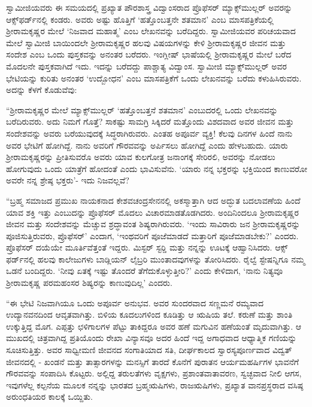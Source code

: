  ಸ್ವಾಮೀಜಿಯವರು ಈ ಸಮಯದಲ್ಲಿ ಪ್ರಖ್ಯಾತ ಪೌರಶಾಸ್ತ್ರ ವಿದ್ವಾಂಸರಾದ ಪ್ರೊಫೆಸರ್ ಮ್ಯಾಕ್ಸ್‌ಮುಲ್ಲರ್ ಅವರನ್ನು ಆಕ್ಸ್​‍ಫರ್ಡ್‍ನಲ್ಲಿ ಕಂಡರು. ಅವರು ಅಷ್ಟು ಹೊತ್ತಿಗೆ ‘ಹತ್ತೊಂಬತ್ತನೇ ಶತಮಾನ’ ಎಂಬ ಮಾಸಪತ್ರಿಕೆಯಲ್ಲಿ ಶ‍್ರೀರಾಮಕೃಷ್ಣರ ಮೇಲೆ ‘ನಿಜವಾದ ಮಹಾತ್ಮ’ ಎಂಬ ಲೇಖನವನ್ನು ಬರೆದಿದ್ದರು. ಸ್ವಾಮೀಜಿಯವರ ಪರಿಚಯವಾದ ಮೇಲೆ ಸ್ವಾಮೀಜಿ ಬಾಯಿಂದಲೇ ಶ‍್ರೀರಾಮಕೃಷ್ಣರ ಹಲವು ವಿಷಯಗಳನ್ನು ಕೇಳಿ ಶ‍್ರೀರಾಮಕೃಷ್ಣರ ಜೀವನ ಮತ್ತು ಸಂದೇಶ ಎಂಬ ಒಂದು ಪುಸ್ತಕವನ್ನು ಅನಂತರ ಬರೆದರು. ಇಂಗ್ಲೀಷ್ ಭಾಷೆಯಲ್ಲಿ ಶ‍್ರೀರಾಮಕೃಷ್ಣರ ಮೇಲೆ ಬರೆದ ಮೊದಲನೇ ಪುಸ್ತಕವಾಗಿದೆ ಇದು. ಇದನ್ನು ಬರೆದದ್ದು ಪಾಶ್ಚಾತ್ಯ ವಿದ್ವಾಂಸ. ಸ್ವಾಮೀಜಿ ಮ್ಯಾಕ್ಸ್‌ಮುಲ್ಲರ್ ಅವರ ಭೇಟಿಯನ್ನು ಕುರಿತು ಅನಂತರ ‘ಉದ್ಬೋಧನ’ ಎಂಬ ಮಾಸಪತ್ರಿಕೆಗೆ ಒಂದು ಲೇಖನವನ್ನು ಬರೆದು ಕಳುಹಿಸಿರುವರು. ಅದನ್ನು ಕೆಳಗೆ ಕೊಡುವೆವು: 

 “ಶ‍್ರೀರಾಮಕೃಷ್ಣರ ಮೇಲೆ ಮ್ಯಾಕ್ಸ್‌ಮುಲ್ಲರ್ ‘ಹತ್ತೊಂಬತ್ತನೆ ಶತಮಾನ’ ಎಂಬುದರಲ್ಲಿ ಒಂದು ಲೇಖನವನ್ನು ಬರೆದಿರುವರು. ಅದು ನಿಮಗೆ ಗೊತ್ತೆ? ಸಾಕಷ್ಟು ಸಾಮಗ್ರಿ ಸಿಕ್ಕಿದರೆ ಮತ್ತೊಂದು ವಿಶದವಾದ ಅವರ ಜೀವನ ಮತ್ತು ಸಂದೇಶವನ್ನು ಅವರು ಬರೆಯುವುದಕ್ಕೆ ಸಿದ್ಧರಾಗಿರುವರು. ಎಂತಹ ಅಪೂರ್ವ ವ್ಯಕ್ತಿ! ಕೆಲವು ದಿನಗಳ ಹಿಂದೆ ನಾನು ಅವರ ಭೇಟಿಗೆ ಹೋಗಿದ್ದೆ. ನಾನು ಅವರಿಗೆ ಗೌರವವನ್ನು ಅರ್ಪಿಸಲು ಹೋಗಿದ್ದೆ ಎಂದು ಹೇಳಬಹುದು. ಯಾರು ಶ‍್ರೀರಾಮಕೃಷ್ಣರನ್ನು ಪ್ರೀತಿಸುವರೊ ಅವರು ಯಾವ ಕುಲಗೋತ್ರ ಜನಾಂಗಕ್ಕೆ ಸೇರಿರಲಿ, ಅವರನ್ನು ನೋಡಲು ಹೋಗುವುದು ಒಂದು ಯಾತ್ರೆಗೆ ಹೋದಂತೆ ಎಂದು ಭಾವಿಸುವೆನು. ‘ಯಾರು ನನ್ನ ಭಕ್ತರನ್ನು ಭಕ್ತಿಯಿಂದ ಕಾಣುವರೋ ಅವರೇ ನನ್ನ ಶ್ರೇಷ್ಠ ಭಕ್ತರು’- ಇದು ನಿಜವಲ್ಲವೆ? 

 “ಬ್ರಹ್ಮ ಸಮಾಜದ ಪ್ರಮುಖ ನಾಯಕನಾದ ಕೇಶವಚಂದ್ರಸೇನನಲ್ಲಿ ಅಕಸ್ಮಾತ್ತಾಗಿ ಆದ ಅದ್ಭುತ ಬದಲಾವಣೆಯ ಹಿಂದೆ ಯಾವ ಶಕ್ತಿ ಇತ್ತು ಎಂಬುದನ್ನು ಪ್ರೊಫೆಸರ್ ಮೊದಲು ವಿಚಾರಮಾಡತೊಡಗಿದರು. ಅಂದಿನಿಂದಲೂ ಶ‍್ರೀರಾಮಕೃಷ್ಣರ ಜೀವನ ಮತ್ತು ಸಂದೇಶವನ್ನು ಮೆಚ್ಚುವ ಶ್ರದ್ಧಾವಂತ ಶಿಷ್ಯರಾಗಿರುವರು. ‘ಇಂದು ಸಾವಿರಾರು ಜನ ಶ‍್ರೀರಾಮಕೃಷ್ಣರನ್ನು ಪೂಜಿಸುತ್ತಿರುವರು, ಪ್ರೊಫೆಸರ್’ ಎಂದಾಗ, ‘ಇಂಥವರಿಗೆ ಪೂಜೆಮಾಡದೆ ಮತ್ತಾರಿಗೆ ಪೂಜೆಮಾಡಬೇಕು?’ ಎಂದರು. ಪ್ರೊಫೆಸರ್ ದಯೆಯೇ ಮೂರ್ತಿವೆತ್ತಂತೆ ಇದ್ದರು. ಮಿಸ್ಟರ್ ಸ್ಟರ‍್ಡಿ ಮತ್ತು ನನ್ನನ್ನು ಊಟಕ್ಕೆ ಆಹ್ವಾನಿಸಿದರು. ಆಕ್ಸ್​‍ಫರ್ಡ್‍ನಲ್ಲಿ ಹಲವು ಕಾಲೇಜುಗಳು ಬಾಡ್ಲಿಯನ್ ಲೈಬ್ರರಿ ಮುಂತಾದವುಗಳನ್ನು ತೋರಿಸಿದರು. ರೈಲ್ವೆ ಸ್ಟೇಷನ್ನಿಗೂ ನಮ್ಮ ಒಡನೆ ಬಂದಿದ್ದರು. ‘ನೀವು ಏತಕ್ಕೆ ಇಷ್ಟು ತೊಂದರೆ ತೆಗೆದುಕೊಳ್ಳುತ್ತೀರಿ?’ ಎಂದು ಕೇಳಿದಾಗ, ‘ನಾನು ನಿತ್ಯವೂ ಶ‍್ರೀರಾಮಕೃಷ್ಣ ಪರಮಹಂಸರ ಶಿಷ್ಯರನ್ನು ಕಾಣುವುದಿಲ್ಲ’ ಎಂದರು. 

 “ಈ ಭೇಟಿ ನಿಜವಾಗಿಯೂ ಒಂದು ಅಪೂರ್ವ ಅನುಭವ. ಅವರ ಸುಂದರವಾದ ಸಣ್ಣಮನೆ ರಮ್ಯವಾದ ಉದ್ಯಾನವನದಿಂದ ಆವೃತವಾಗಿತ್ತು. ಬಿಳಿಯ ಕೂದಲುಗಳಿಂದ ಕೂಡಿತ್ತು ಆ ಋಷಿಯ ತಲೆ. ಕರುಣೆ ಮತ್ತು ಶಾಂತಿ ಉಕ್ಕುತ್ತಿದ್ದ ಮೊಗ. ಎಪ್ಪತ್ತು ಛಳಿಗಾಲಗಳ ಪೆಟ್ಟು ತಾಕಿದ್ದರೂ ಅವರ ಹಣೆ ಮಗುವಿನ ಹಣೆಯಂತೆ ಮೃದುವಾಗಿತ್ತು. ಆ ಮುಖದಲ್ಲಿ ಚಿತ್ರವಾಗಿದ್ದ ಪ್ರತಿಯೊಂದು ರೇಖಾ ವಿನ್ಯಾಸವೂ ಅದರ ಹಿಂದೆ ಇದ್ದ ಅಗಾಧವಾದ ಆಧ್ಯಾತ್ಮಿಕ ಗಣಿಯನ್ನು ಸೂಚಿಸುತ್ತಿತ್ತು. ಅವರ ಸಾಧ್ವೀಮಣಿ ಜೀವನದ ಸಂಗಾತಿಯಾದ ಸತಿ, ದೀರ್ಘಕಾಲದ ಸ್ವಾರಸ್ಯಪೂರ್ಣವಾದ ವಿದ್ವತ್ ಜೀವನದಲ್ಲಿ - ಖಂಡನೆ ಮತ್ತು ತಾತ್ಸಾರಗಳನ್ನು ಮನಸ್ಸಿಗೆ ತಾರದೆ ಕೊನೆಗೆ ಪುರಾತನ ಆರ್ಯಮಹರ್ಷಿಗಳ ಭಾವನೆಗೆ ಗೌರವವನ್ನು ಸಂಪಾದಿಸಿ ಕೊಟ್ಟರು. ಅಲ್ಲಿದ್ದ ತರುಲತೆಗಳು ವೃಕ್ಷಗಳು, ಪ್ರಶಾಂತವಾತಾವರಣ, ಸ್ವಚ್ಛವಾದ ನೀಲಿ ಆಗಸ, ಇವುಗಳೆಲ್ಲ ಕಲ್ಪನೆಯ ಮೂಲಕ ನನ್ನನ್ನು ಭಾರತದ ಬ್ರಹ್ಮಋಷಿಗಳು, ರಾಜಋಷಿಗಳು, ಪ್ರಖ್ಯಾತ ವಾನಪ್ರಸ್ಥರಾದ ವಸಿಷ್ಠ ಅರುಂಧತಿಯರ ಕಾಲಕ್ಕೆ ಒಯ್ದಿತು.

